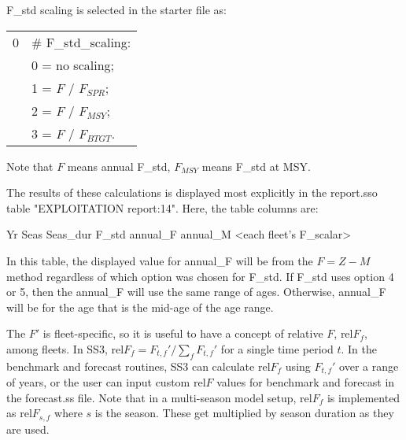 F\_std scaling is selected in the starter file as:
\begin{center}
	\begin{longtable}{p{2cm} p{12cm}}
		\hline
		0 & \# F\_std\_scaling: \Tstrut\\
		& 0 = no scaling; \\
		& 1 = $F$ / $F_{SPR}$; \\ 
		& 2 = $F$ / $F_{MSY}$; \\
		& 3 = $F$ / $F_{BTGT}$.\Bstrut\\
		\hline
	\end{longtable}
	\vspace*{-1.7\baselineskip}
\end{center}

Note that $F$ means annual F\_std, $F_{MSY}$ means F\_std at MSY.

The results of these calculations is displayed most explicitly in the report.sso table "EXPLOITATION report:14". Here, the table columns are:

Yr Seas Seas\_dur F\_std annual\_F annual\_M <each fleet's F\_scalar>

In this table, the displayed value for annual\_F will be from the $F=Z-M$ method regardless of which option was chosen for F\_std.  If F\_std uses option 4 or 5, then the annual\_F will use the same range of ages. Otherwise, annual\_F will be for the age that is the mid-age of the age range.



The $F'$ is fleet-specific, so it is useful to have a concept of relative $F$, $\text{rel}F_f$, among fleets. In SS3, $\text{rel}F_f= F_{t,f}'/\sum_{f}^{}F_{t,f}'$ for a single time period $t$. In the benchmark and forecast routines, SS3 can calculate $\text{rel}F_f$ using $F_{t,f}'$ over a range of years, or the user can input custom $\text{rel}F$ values for benchmark and forecast in the forecast.ss file. Note that in a multi-season model setup, $\text{rel}F_f$ is implemented as $\text{rel}F_{s,f}$ where $s$ is the season. These get multiplied by season duration as they are used.

